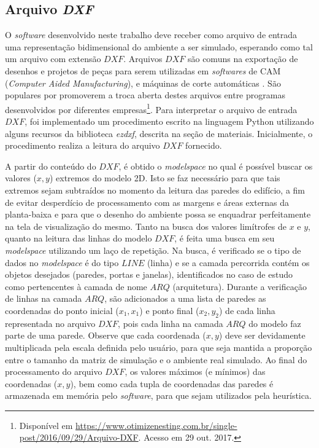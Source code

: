 \documentclass[
	12pt,				%
	twoside,			%
	a4paper,			%
	english,			%
	french,				%
	spanish,			%
	brazil				%
	]{abntex2}
\begin{document}
\subsection{\texorpdfstring{Arquivo
\emph{DXF}}{Arquivo DXF}}\label{arquivo-dxf}

O \emph{software} desenvolvido neste trabalho deve receber como arquivo
de entrada uma representação bidimensional do ambiente a ser simulado,
esperando como tal um arquivo com extensão \(DXF\). Arquivos \(DXF\) são
comuns na exportação de desenhos e projetos de peças para serem
utilizadas em \emph{softwares} de CAM (\emph{Computer Aided
Manufacturing}), e máquinas de corte automáticas \cite{SOUZA}. São
populares por promoverem a troca aberta destes arquivos entre programas
desenvolvidos por diferentes empresas\footnote{Disponível em
  \url{https://www.otimizenesting.com.br/single-post/2016/09/29/Arquivo-DXF}.
  Acesso em 29 out. 2017.}. Para interpretar o arquivo de entrada
\(DXF\), foi implementado um procedimento escrito na linguagem Python
utilizando alguns recursos da biblioteca \emph{ezdxf}, descrita na seção
de materiais. Inicialmente, o procedimento realiza a leitura do arquivo
\(DXF\) fornecido.

A partir do conteúdo do \(DXF\), é obtido o \emph{modelspace} no qual é
possível buscar os valores (\(x, y\)) extremos do modelo 2D. Isto se faz
necessário para que tais extremos sejam subtraídos no momento da leitura
das paredes do edifício, a fim de evitar desperdício de processamento
com as margens e áreas externas da planta-baixa e para que o desenho do
ambiente possa se enquadrar perfeitamente na tela de visualização do
mesmo. Tanto na busca dos valores limítrofes de \(x\) e \(y\), quanto na
leitura das linhas do modelo \(DXF\), é feita uma busca em seu
\emph{modelspace} utilizando um laço de repetição. Na busca, é
verificado se o tipo de dados no \emph{modelspace} é do tipo \(LINE\)
(linha) e se a camada percorrida contém os objetos desejados (paredes,
portas e janelas), identificados no caso de estudo como pertencentes à
camada de nome \(ARQ\) (arquitetura). Durante a verificação de linhas na
camada \(ARQ\), são adicionados a uma lista de paredes as coordenadas do
ponto inicial (\(x_{1},x_{1}\)) e ponto final (\(x_{2},y_{2}\)) de cada
linha representada no arquivo \(DXF\), pois cada linha na camada \(ARQ\)
do modelo faz parte de uma parede. Observe que cada coordenada
(\(x, y\)) deve ser devidamente multiplicada pela escala definida pelo
usuário, para que seja mantida a proporção entre o tamanho da matriz de
simulação e o ambiente real simulado. Ao final do processamento do
arquivo \(DXF\), os valores máximos (e mínimos) das coordenadas
(\(x, y\)), bem como cada tupla de coordenadas das paredes é armazenada
em memória pelo \emph{software}, para que sejam utilizados pela
heurística.
\end{document}
